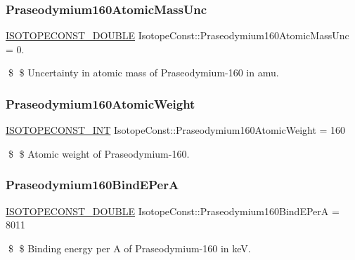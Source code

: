 \subsubsection{\texorpdfstring{Praseodymium160\+Atomic\+Mass\+Unc}{Praseodymium160AtomicMassUnc}}
{\footnotesize\ttfamily \mbox{\hyperlink{group___isotope_const-_macros_ga8f45a7272ce02c0b4c65c44636ed719a}{I\+S\+O\+T\+O\+P\+E\+C\+O\+N\+S\+T\+\_\+\+D\+O\+U\+B\+LE}} Isotope\+Const\+::\+Praseodymium160\+Atomic\+Mass\+Unc = 0.}

\$ \$ Uncertainty in atomic mass of Praseodymium-\/160 in amu. \mbox{\label{group___isotope_const-_praseodymium-_pr160_ga7d2ad1ccd15706c652f5126b7778bdba}} 
\subsubsection{\texorpdfstring{Praseodymium160\+Atomic\+Weight}{Praseodymium160AtomicWeight}}
{\footnotesize\ttfamily \mbox{\hyperlink{group___isotope_const-_macros_ga5f18360b3e99483a35c32d789e62621c}{I\+S\+O\+T\+O\+P\+E\+C\+O\+N\+S\+T\+\_\+\+I\+NT}} Isotope\+Const\+::\+Praseodymium160\+Atomic\+Weight = 160}

\$ \$ Atomic weight of Praseodymium-\/160. \mbox{\label{group___isotope_const-_praseodymium-_pr160_ga70348138a3a44ce2ab48d84a3c5e2b47}} 
\subsubsection{\texorpdfstring{Praseodymium160\+Bind\+E\+PerA}{Praseodymium160BindEPerA}}
{\footnotesize\ttfamily \mbox{\hyperlink{group___isotope_const-_macros_ga8f45a7272ce02c0b4c65c44636ed719a}{I\+S\+O\+T\+O\+P\+E\+C\+O\+N\+S\+T\+\_\+\+D\+O\+U\+B\+LE}} Isotope\+Const\+::\+Praseodymium160\+Bind\+E\+PerA = 8011}

\$ \$ Binding energy per A of Praseodymium-\/160 in keV. \mbox{\label{group___isotope_const-_praseodymium-_pr160_ga2f3a739191dd8aee0a7310ec318e1834}} 
